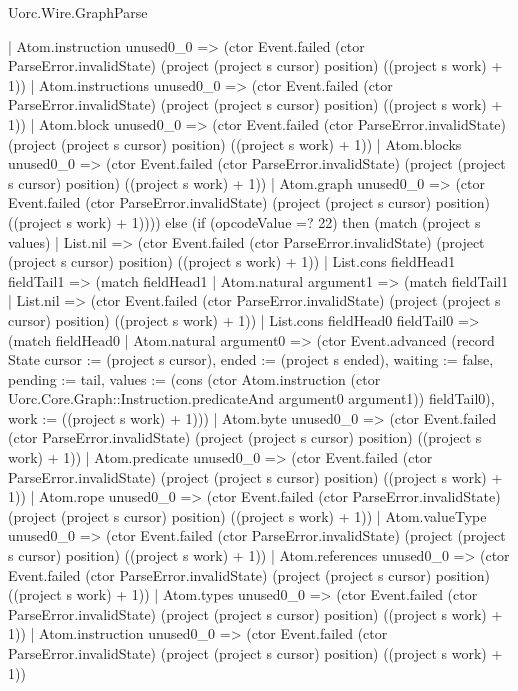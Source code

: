 \begin{lexlean}{Uorc.Wire.GraphParse}
\begin{semanticmodule}
{          | Atom.instruction unused0_0 => (ctor Event.failed (ctor ParseError.invalidState) (project (project s cursor) position) ((project s work) + 1))
          | Atom.instructions unused0_0 => (ctor Event.failed (ctor ParseError.invalidState) (project (project s cursor) position) ((project s work) + 1))
          | Atom.block unused0_0 => (ctor Event.failed (ctor ParseError.invalidState) (project (project s cursor) position) ((project s work) + 1))
          | Atom.blocks unused0_0 => (ctor Event.failed (ctor ParseError.invalidState) (project (project s cursor) position) ((project s work) + 1))
          | Atom.graph unused0_0 => (ctor Event.failed (ctor ParseError.invalidState) (project (project s cursor) position) ((project s work) + 1)))) else (if (opcodeValue =? 22) then (match (project s values)
        | List.nil => (ctor Event.failed (ctor ParseError.invalidState) (project (project s cursor) position) ((project s work) + 1))
        | List.cons fieldHead1 fieldTail1 => (match fieldHead1
          | Atom.natural argument1 => (match fieldTail1
            | List.nil => (ctor Event.failed (ctor ParseError.invalidState) (project (project s cursor) position) ((project s work) + 1))
            | List.cons fieldHead0 fieldTail0 => (match fieldHead0
              | Atom.natural argument0 => (ctor Event.advanced (record State {cursor := (project s cursor), ended := (project s ended), waiting := false, pending := tail, values := (cons (ctor Atom.instruction (ctor Uorc.Core.Graph::Instruction.predicateAnd argument0 argument1)) fieldTail0), work := ((project s work) + 1)}))
              | Atom.byte unused0_0 => (ctor Event.failed (ctor ParseError.invalidState) (project (project s cursor) position) ((project s work) + 1))
              | Atom.predicate unused0_0 => (ctor Event.failed (ctor ParseError.invalidState) (project (project s cursor) position) ((project s work) + 1))
              | Atom.rope unused0_0 => (ctor Event.failed (ctor ParseError.invalidState) (project (project s cursor) position) ((project s work) + 1))
              | Atom.valueType unused0_0 => (ctor Event.failed (ctor ParseError.invalidState) (project (project s cursor) position) ((project s work) + 1))
              | Atom.references unused0_0 => (ctor Event.failed (ctor ParseError.invalidState) (project (project s cursor) position) ((project s work) + 1))
              | Atom.types unused0_0 => (ctor Event.failed (ctor ParseError.invalidState) (project (project s cursor) position) ((project s work) + 1))
              | Atom.instruction unused0_0 => (ctor Event.failed (ctor ParseError.invalidState) (project (project s cursor) position) ((project s work) + 1))
}
\end{semanticmodule}
\end{lexlean}
